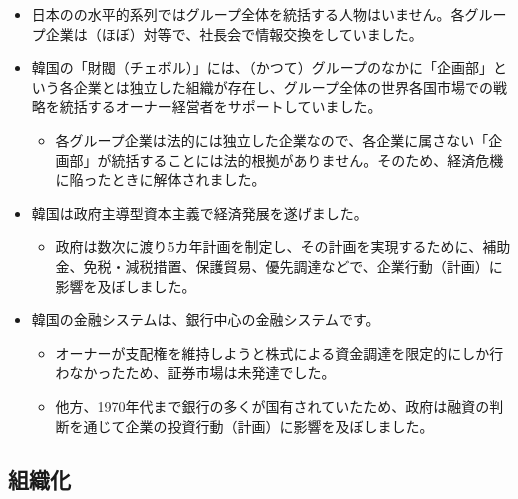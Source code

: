 \documentclass[
]{book}
\providecommand{\tightlist}{%
  \setlength{\itemsep}{0pt}\setlength{\parskip}{0pt}}
\begin{document}
\begin{itemize}
\item
  日本のの水平的系列ではグループ全体を統括する人物はいません。各グループ企業は（ほぼ）対等で、社長会で情報交換をしていました。
\item
  韓国の「財閥（チェボル）」には、（かつて）グループのなかに「企画部」という各企業とは独立した組織が存在し、グループ全体の世界各国市場での戦略を統括するオーナー経営者をサポートしていました。

  \begin{itemize}
  \tightlist
  \item
    各グループ企業は法的には独立した企業なので、各企業に属さない「企画部」が統括することには法的根拠がありません。そのため、経済危機に陥ったときに解体されました。
  \end{itemize}
\item
  韓国は政府主導型資本主義で経済発展を遂げました。

  \begin{itemize}
  \tightlist
  \item
    政府は数次に渡り5カ年計画を制定し、その計画を実現するために、補助金、免税・減税措置、保護貿易、優先調達などで、企業行動（計画）に影響を及ぼしました。
  \end{itemize}
\item
  韓国の金融システムは、銀行中心の金融システムです。

  \begin{itemize}
  \item
    オーナーが支配権を維持しようと株式による資金調達を限定的にしか行わなかったため、証券市場は未発達でした。
  \item
    他方、1970年代まで銀行の多くが国有されていたため、政府は融資の判断を通じて企業の投資行動（計画）に影響を及ぼしました。
  \end{itemize}
\end{itemize}

\hypertarget{asia-organization}{%
\subsection{組織化}\label{asia-organization}}
\end{document}
